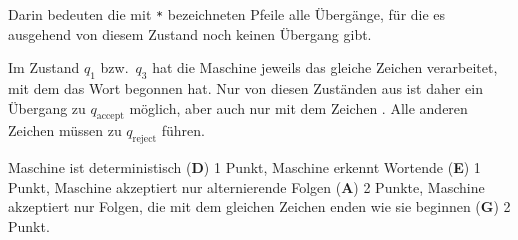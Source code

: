 \begin{loesung}
\begin{center}
\end{center}
Darin bedeuten die mit \texttt{*} bezeichneten Pfeile alle Übergänge, für die
es ausgehend von diesem Zustand noch keinen Übergang gibt.

Im Zustand $q_1$ bzw.~$q_3$ hat die Maschine jeweils das gleiche Zeichen
verarbeitet, mit dem das Wort begonnen hat.
Nur von diesen Zuständen aus ist daher ein Übergang zu $q_{\text{accept}}$
möglich, aber auch nur mit dem Zeichen \blank.
Alle anderen Zeichen müssen zu $q_{\text{reject}}$ führen.
\end{loesung}

\begin{bewertung}
Maschine ist deterministisch ({\bf D}) 1 Punkt,
Maschine erkennt Wortende ({\bf E}) 1 Punkt,
Maschine akzeptiert nur alternierende Folgen ({\bf A}) 2 Punkte,
Maschine akzeptiert nur Folgen, die mit dem gleichen Zeichen enden wie
sie beginnen ({\bf G}) 2 Punkt.
\end{bewertung}



